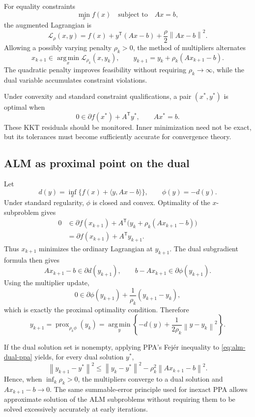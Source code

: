 \documentclass[12pt,oneside]{book}
\numberwithin{equation}{section}
\theoremstyle{definition}
\theoremstyle{plain}
\theoremstyle{remark}
\newcommand{\argmin}{\operatorname*{arg\,min}}
\newcommand{\norm}[1]{\left\lVert #1 \right\rVert}
\begin{document}
For equality constraints
\[
    \min_x f(x)\quad\text{subject to}\quad Ax=b,
\]
the augmented Lagrangian is
\begin{equation}
 \mathcal L_\rho(x,y)
 =f(x)+y^\mathsf T(Ax-b)+\frac\rho2\norm{Ax-b}^2.
 \label{eq:augmented-lagrangian}
\end{equation}
Allowing a possibly varying penalty $\rho_k>0$, the method of multipliers
alternates
\[
 x_{k+1}\in\argmin_x\mathcal L_{\rho_k}(x,y_k),\qquad
 y_{k+1}=y_k+\rho_k(Ax_{k+1}-b).
\]
The quadratic penalty improves feasibility without requiring
$\rho_k\to\infty$, while the dual variable accumulates constraint violations.

Under convexity and standard constraint qualifications, a pair $(x^*,y^*)$
is optimal when
\[
    0\in\partial f(x^*)+A^\mathsf Ty^*,\qquad Ax^*=b.
\]
These KKT residuals should be monitored. Inner minimization need not be exact,
but its tolerances must become sufficiently accurate for convergence theory.

\subsection{ALM as proximal point on the dual}

Let
\[
 d(y)=\inf_x\{f(x)+\langle y,Ax-b\rangle\},
 \qquad \phi(y)=-d(y).
\]
Under standard regularity, $\phi$ is closed and convex. Optimality of the
$x$-subproblem gives
\begin{align*}
 0&\in\partial f(x_{k+1})
 +A^\mathsf T\bigl(y_k+\rho_k(Ax_{k+1}-b)\bigr)\\
 &=\partial f(x_{k+1})+A^\mathsf Ty_{k+1}.
\end{align*}
Thus $x_{k+1}$ minimizes the ordinary Lagrangian at $y_{k+1}$. The dual
subgradient formula then gives
\[
 Ax_{k+1}-b\in\partial d(y_{k+1}),
 \qquad b-Ax_{k+1}\in\partial\phi(y_{k+1}).
\]
Using the multiplier update,
\[
 0\in\partial\phi(y_{k+1})+\frac1{\rho_k}(y_{k+1}-y_k),
\]
which is exactly the proximal optimality condition. Therefore
\begin{equation}\label{eq:alm-dual-ppa}
 y_{k+1}=\operatorname{prox}_{\rho_k\phi}(y_k)
 =\argmin_y\left\{-d(y)+\frac1{2\rho_k}\norm{y-y_k}^2\right\}.
\end{equation}

If the dual solution set is nonempty, applying PPA's Fejér inequality to
\eqref{eq:alm-dual-ppa} yields, for every dual solution $y^*$,
\[
 \norm{y_{k+1}-y^*}^2
 \leq\norm{y_k-y^*}^2
 -\rho_k^2\norm{Ax_{k+1}-b}^2.
\]
Hence, when $\inf_k\rho_k>0$, the multipliers converge to a dual solution and
$Ax_{k+1}-b\to0$. The same summable-error principle used for inexact PPA
allows approximate solution of the ALM subproblems without requiring them to
be solved excessively accurately at early iterations.
\end{document}
